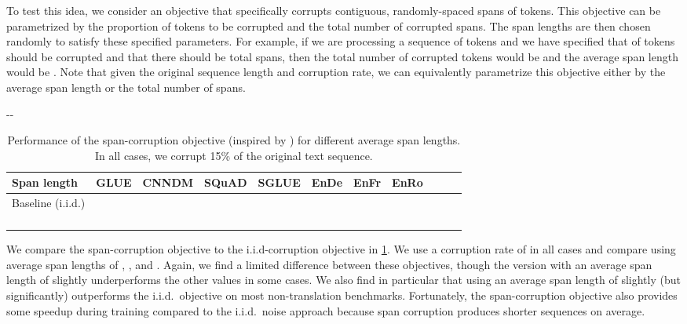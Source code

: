 \documentclass[twoside,11pt]{article}
\newlength{\offsetpage}
\newenvironment{widepage}{\begin{adjustwidth}{-\offsetpage}{-\offsetpage}\addtolength{\textwidth}{2\offsetpage}}{\end{adjustwidth}}
\newcommand{\bsl}{\makebox[0pt][r]{\raisebox{0.05em}{}}}
\begin{document}
To test this idea, we consider an objective that specifically corrupts contiguous, randomly-spaced spans of tokens.
This objective can be parametrized by the proportion of tokens to be corrupted and the total number of corrupted spans.
The span lengths are then chosen randomly to satisfy these specified parameters.
For example, if we are processing a sequence of  tokens and we have specified that  of tokens should be corrupted and that there should be  total spans, then the total number of corrupted tokens would be  and the average span length would be .
Note that given the original sequence length and corruption rate, we can equivalently parametrize this objective either by the average span length or the total number of spans.
\begin{table}
\footnotesize
\begin{widepage}
\centering
\begin{tabular}{l c c c c c c c c c c}
\toprule
    Span length            & GLUE        & CNNDM       & SQuAD       & SGLUE       & EnDe        & EnFr        & EnRo    \\
\midrule
    \bsl Baseline (i.i.d.) &  &      &      &      &  &  &  \\
                        &  &      &  &  &  &  &  \\
                        &  &  &  &  &  &      &  \\
                        &  &      &  &  &  &      &  \\
                       &      &      &  &      &  &      &  \\
\bottomrule
\end{tabular}
\end{widepage}
\caption{
Performance of the span-corruption objective (inspired by \cite{joshi2019spanbert}) for different average span lengths.
In all cases, we corrupt 15\% of the original text sequence.
}
\label{tab:objectives_span}
\end{table}

We compare the span-corruption objective to the i.i.d-corruption objective in \cref{tab:objectives_span}.
We use a corruption rate of  in all cases and compare using average span lengths of , ,  and .
Again, we find a limited difference between these objectives, though the version with an average span length of  slightly underperforms the other values in some cases.
We also find in particular that using an average span length of  slightly (but significantly) outperforms the i.i.d.\ objective on most non-translation benchmarks.
Fortunately, the span-corruption objective also provides some speedup during training compared to the i.i.d.\ noise approach because span corruption produces shorter sequences on average.
\end{document}
